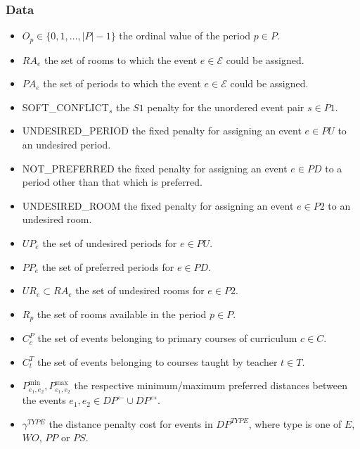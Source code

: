 \documentclass{article}
\newcommand{\E}{\mathcal{E}}
\begin{document}
\subsubsection*{Data}
\begin{itemize}
    \item $O_p \in \{0,1,\dots,|P| - 1\}$ the ordinal value of the period $p \in
        P$.
    \item $RA_e$ the set of rooms to which the event $e \in \E$ could be
        assigned.
    \item $PA_e$ the set of periods to which the event $e \in \E$ could be
        assigned.
    \item SOFT\_CONFLICT$_s$ the $S1$ penalty for the unordered event pair $s \in
        P1$.
    \item UNDESIRED\_PERIOD the fixed penalty for assigning an event $e \in PU$
        to an undesired period.
    \item NOT\_PREFERRED the fixed penalty for assigning an event $e \in PD$ to
        a period other than that which is preferred.
    \item UNDESIRED\_ROOM the fixed penalty for assigning an event $e \in P2$ to
        an undesired room.
    \item $UP_e$ the set of undesired periods for $e \in PU$.
    \item $PP_e$ the set of preferred periods for $e \in PD$.
    \item $UR_e \subset RA_e$ the set of undesired rooms for $e \in P2$.
    \item $R_p$ the set of rooms available in the period $p \in P$.
    \item $C^P_c$ the set of events belonging to primary courses of curriculum
        $c \in C$.
    \item $C^T_t$ the set of events belonging to courses taught by teacher $t
        \in T$.
    \item $P_{e_1, e_2}^\text{min}, P_{e_1, e_2}^\text{max}$ the respective
        minimum/maximum preferred distances between the events $e_1, e_2 \in
        DP^\leftarrow \cup DP^\leftrightarrow$.
    \item $\gamma^{TYPE}$ the distance penalty cost for events in $DP^{TYPE}$, where
        type is one of $E$, $WO$, $PP$ or $PS$.
\end{itemize}

\bigbreak
\end{document}

